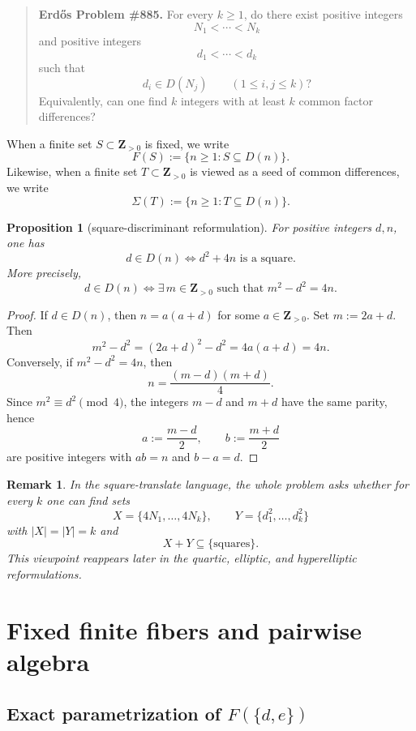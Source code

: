 \documentclass[11pt]{article}
\theoremstyle{plainbreak}
\newtheorem{proposition}[theorem]{Proposition}
\theoremstyle{defbreak}
\newtheorem{remark}[theorem]{Remark}
\newcommand{\Dset}{D}
\newcommand{\Fset}{F}
\newcommand{\Z}{\mathbf{Z}}
\begin{document}
\begin{quote}
\textbf{Erd\H{o}s Problem \#885.}
For every $k\ge 1$, do there exist positive integers
\[
N_1<\cdots<N_k
\]
and positive integers
\[
d_1<\cdots<d_k
\]
such that
\[
d_i\in \Dset(N_j)\qquad (1\le i,j\le k)?
\]
Equivalently, can one find $k$ integers with at least $k$ common factor differences?
\end{quote}

When a finite set $S\subset \Z_{>0}$ is fixed, we write
\[
\Fset(S):=\{n\ge 1:S\subseteq \Dset(n)\}.
\]
Likewise, when a finite set $T\subset \Z_{>0}$ is viewed as a seed of common differences, we write
\[
\Sigma(T):=\{n\ge 1:T\subseteq \Dset(n)\}.
\]

\begin{proposition}[square-discriminant reformulation]
For positive integers $d,n$, one has
\[
d\in \Dset(n)\iff d^2+4n \text{ is a square}.
\]
More precisely,
\[
d\in \Dset(n)\iff \exists\,m\in\Z_{>0}\text{ such that }m^2-d^2=4n.
\]
\end{proposition}

\begin{proof}
If $d\in \Dset(n)$, then $n=a(a+d)$ for some $a\in\Z_{>0}$.  Set $m:=2a+d$. Then
\[
m^2-d^2=(2a+d)^2-d^2=4a(a+d)=4n.
\]
Conversely, if $m^2-d^2=4n$, then
\[
n=\frac{(m-d)(m+d)}{4}.
\]
Since $m^2\equiv d^2\pmod 4$, the integers $m-d$ and $m+d$ have the same parity, hence
\[
a:=\frac{m-d}{2},\qquad b:=\frac{m+d}{2}
\]
are positive integers with $ab=n$ and $b-a=d$.
\end{proof}

\begin{remark}
In the square-translate language, the whole problem asks whether for every $k$ one can find sets
\[
X=\{4N_1,\dots,4N_k\},\qquad Y=\{d_1^2,\dots,d_k^2\}
\]
with $|X|=|Y|=k$ and
\[
X+Y\subseteq \{\text{squares}\}.
\]
This viewpoint reappears later in the quartic, elliptic, and hyperelliptic reformulations.
\end{remark}

\section{Fixed finite fibers and pairwise algebra}

\subsection{Exact parametrization of $\Fset(\{d,e\})$}
\end{document}
